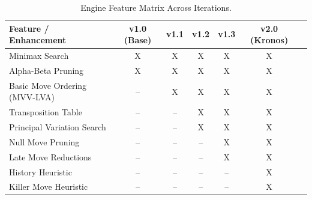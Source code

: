 \begin{table}[htbp]
\caption[Engine Feature Matrix Across Iterations]{Engine Feature Matrix Across Iterations.}


\label{tab:engine_feature_matrix}
\centering
\begin{tabular}{lcccccc}
\toprule
\textbf{Feature / Enhancement} & \textbf{v1.0 (Base)} & \textbf{v1.1} & \textbf{v1.2} & \textbf{v1.3} & \textbf{v2.0 (Kronos)} \\
\midrule
Minimax Search               & X & X & X & X & X \\
Alpha-Beta Pruning           & X & X & X & X & X \\
Basic Move Ordering (MVV-LVA) & --         & X & X & X & X \\
Transposition Table          & --         & --         & X & X & X \\
Principal Variation Search   & --         & --         & X & X & X \\
Null Move Pruning            & --         & --         & --         & X & X \\
Late Move Reductions         & --         & --         & --         & X & X \\
History Heuristic            & --         & --         & --         & --         & X \\
Killer Move Heuristic        & --         & --         & --         & --         & X \\
\bottomrule
\end{tabular}
\end{table}
